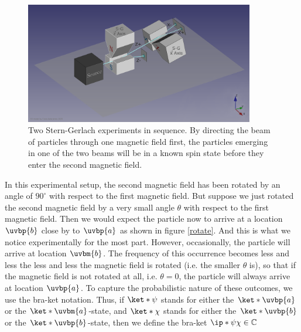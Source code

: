 \documentclass[12pt]{report}
\begin{document}
\begin{figure}[ht!]
\captionsetup{justification=centering}
\centering
\includegraphics[width=100mm]{Chapter01/1920px-Stern-Gerlach_Analyzer_Sequential_Series_E2v.png}
\vspace*{10px}
\caption[Two Stern-Gerlach experiments in sequence]{Two Stern-Gerlach experiments in sequence. By directing the beam of particles through one magnetic field first, the particles emerging in one of the two beams will be in a known spin state before they enter the second magnetic field.\protect\footnotemark}
\label{knownspin}
\end{figure}
 In this experimental setup, the second magnetic field has been rotated by an angle of $90^\circ$ with respect to the first magnetic field. But suppose we just rotated the second magnetic field by a very small angle $\theta$ with respect to the first magnetic field. Then we would expect the particle now to arrive at a location  $\uvbp{b}$ close by to $\uvbp{a}$ as shown in figure \ref{rotate}. And this is what we notice experimentally for the most part. However, occasionally, the particle will arrive at location $\uvbm{b}$. The frequency of this occurrence becomes less and less the less and less the magnetic field is rotated (i.e. the smaller $\theta$ is), so that if the magnetic field is not rotated at all, i.e. $\theta=0$, the particle will always arrive at location $\uvbp{a}$. 
To capture the probabilistic nature of these outcomes, we use the bra-ket notation. Thus, if $\ket*{\psi}$ stands for either the $\ket*{\uvbp{a}}$ or the $\ket*{\uvbm{a}}$-state, and $\ket*{\chi}$ stands for either the $\ket*{\uvbp{b}}$ or the $\ket*{\uvbp{b}}$-state, then we define the bra-ket $\ip*{\psi}{\chi}\in\mathbb{C}$  %
\end{document}
